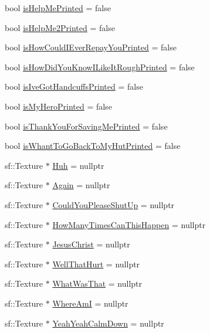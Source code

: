 \begin{DoxyCompactItemize}
\item 
bool \hyperlink{classDialogue_a8b9eaef2c248ac01a1e9d3fc3a3ccf1d}{is\+Help\+Me\+Printed} = false
\item 
bool \hyperlink{classDialogue_a32d1cdc3bc3992e0b7cc733af8cd901a}{is\+Help\+Me2\+Printed} = false
\item 
bool \hyperlink{classDialogue_a73db3d32db589709bda5de4a51dc941a}{is\+How\+Could\+I\+Ever\+Repay\+You\+Printed} = false
\item 
bool \hyperlink{classDialogue_af369801ab5288dc8ff37da346fc23556}{is\+How\+Did\+You\+Know\+I\+Like\+It\+Rough\+Printed} = false
\item 
bool \hyperlink{classDialogue_af57c1594003386937920fc9287589bc1}{is\+Ive\+Got\+Handcuffs\+Printed} = false
\item 
bool \hyperlink{classDialogue_a463330f42c3ff13d9e8e99e29eb726eb}{is\+My\+Hero\+Printed} = false
\item 
bool \hyperlink{classDialogue_ad45b70d075d6f8029c5d08fb20f39452}{is\+Thank\+You\+For\+Saving\+Me\+Printed} = false
\item 
bool \hyperlink{classDialogue_a622780a2b8189ceeba01e3bd64b9c4a3}{is\+Whant\+To\+Go\+Back\+To\+My\+Hut\+Printed} = false
\item 
sf\+::\+Texture $\ast$ \hyperlink{classDialogue_a20a28f958cc46b2cf20de4d448a68cba}{Huh} = nullptr
\item 
sf\+::\+Texture $\ast$ \hyperlink{classDialogue_a17f1839e3ebbca2cca847d53e9b958a1}{Again} = nullptr
\item 
sf\+::\+Texture $\ast$ \hyperlink{classDialogue_a096e13e79fd7fe87bcca35587b983096}{Could\+You\+Please\+Shut\+Up} = nullptr
\item 
sf\+::\+Texture $\ast$ \hyperlink{classDialogue_a5b48f0c92e6d73203ae69b48cb346341}{How\+Many\+Times\+Can\+This\+Happen} = nullptr
\item 
sf\+::\+Texture $\ast$ \hyperlink{classDialogue_ac65dd7b620f7aedb611f54dbd5cc5a23}{Jesus\+Christ} = nullptr
\item 
sf\+::\+Texture $\ast$ \hyperlink{classDialogue_a85a2bc7dcc0ea297684e52170f24677a}{Well\+That\+Hurt} = nullptr
\item 
sf\+::\+Texture $\ast$ \hyperlink{classDialogue_a94995b8fa3e4a2ab6987d05bb0070800}{What\+Was\+That} = nullptr
\item 
sf\+::\+Texture $\ast$ \hyperlink{classDialogue_aea8f799a49bbd52aa97d06be06d2df78}{Where\+AmI} = nullptr
\item 
sf\+::\+Texture $\ast$ \hyperlink{classDialogue_a76c288944980116289e0f82fe8e03cd6}{Yeah\+Yeah\+Calm\+Down} = nullptr

\end{DoxyCompactItemize}
